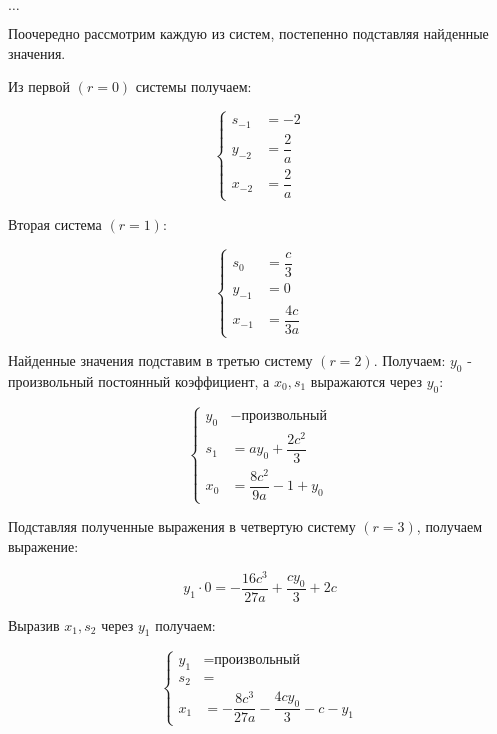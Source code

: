 \begin{center}
	$ \ldots $
\end{center}

\clearpage
						
Поочередно рассмотрим каждую из систем, постепенно подставляя найденные значения.

Из первой $ (r = 0) $ системы получаем:

$$
\left\{
	\begin{aligned}
		s_{-1} &= -2 \\
		y_{-2} &= \dfrac{2}{a} \\
		x_{-2} &= \dfrac{2}{a}
	\end{aligned}
\right.
$$

Вторая система $ (r = 1) $:

$$
\left\{
	\begin{aligned}
		s_{0} &= \dfrac{c}{3} \\
		y_{-1} &= 0 \\
		x_{-1} &= \dfrac{4c}{3a}
	\end{aligned}
\right.
$$

Найденные значения подставим в третью систему $ (r = 2) $. Получаем: $ y_0 $ - произвольный постоянный коэффициент, а $ x_0, s_1 $ выражаются через $ y_0 $:

$$
\left\{
	\begin{aligned}
		y_{0} &- \text{произвольный} \\
		s_{1} &= ay_0 + \dfrac{2c^2}{3} \\
		x_{0} &= \dfrac{8c^2}{9a} - 1 + y_0
	\end{aligned}
\right.
$$

Подставляя полученные выражения в четвертую систему $ (r = 3) $, получаем выражение:

$$
	y_1 \cdot 0 = -\dfrac{16c^3}{27a} + \dfrac{cy_0}{3} + 2c
$$

Выразив $ x_1, s_2 $ через $ y_1 $ получаем:

$$
\left\{
	\begin{aligned}
		y_1  &= \text{произвольный} \\
		s_{2} &=  \\
		x_{1} &= -\dfrac{8c^3}{27a} -\dfrac{4cy_0}{3} - c - y_1
	\end{aligned}
\right.
$$




